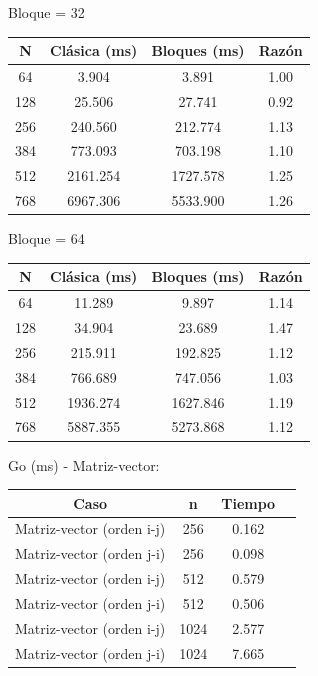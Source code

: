 \documentclass[11pt]{article}
\begin{document}
Bloque = 32
\begin{center}
\begin{tabular}{|c|c|c|c|}
\hline
N & Clásica (ms) & Bloques (ms) & Razón \\
\hline
64 & 3.904 & 3.891 & 1.00 \\
128 & 25.506 & 27.741 & 0.92 \\
256 & 240.560 & 212.774 & 1.13 \\
384 & 773.093 & 703.198 & 1.10 \\
512 & 2161.254 & 1727.578 & 1.25 \\
768 & 6967.306 & 5533.900 & 1.26 \\
\hline
\end{tabular}
\end{center}

Bloque = 64
\begin{center}
\begin{tabular}{|c|c|c|c|}
\hline
N & Clásica (ms) & Bloques (ms) & Razón \\
\hline
64 & 11.289 & 9.897 & 1.14 \\
128 & 34.904 & 23.689 & 1.47 \\
256 & 215.911 & 192.825 & 1.12 \\
384 & 766.689 & 747.056 & 1.03 \\
512 & 1936.274 & 1627.846 & 1.19 \\
768 & 5887.355 & 5273.868 & 1.12 \\
\hline
\end{tabular}
\end{center}

Go (ms) - Matriz-vector:
\begin{center}
\begin{tabular}{|c|c|c|c|}
\hline
Caso & n & Tiempo \\
\hline
Matriz-vector (orden i-j) & 256 & 0.162 \\
Matriz-vector (orden j-i) & 256 & 0.098 \\
Matriz-vector (orden i-j) & 512 & 0.579 \\
Matriz-vector (orden j-i) & 512 & 0.506 \\
Matriz-vector (orden i-j) & 1024 & 2.577 \\
Matriz-vector (orden j-i) & 1024 & 7.665 \\
\hline
\end{tabular}
\end{center}
\end{document}
